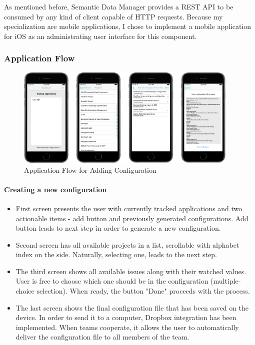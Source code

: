 As mentioned before, Semantic Data Manager provides a REST API to be consumed by any kind of client capable of HTTP requests. Because my specialization are mobile applications, I chose to implement a mobile application for iOS as an administrating user interface for this component.

\subsubsection{Application Flow}

\begin{figure}[!ht]
	\centering
	\includegraphics[width=0.95\textwidth]{figures/04_implementation/add_flow}
    \caption{Application Flow for Adding Configuration}
\end{figure}

\paragraph{Creating a new configuration}

\begin{itemize}
	\item First screen presents the user with currently tracked applications and two actionable items - add button and previously generated configurations. Add button leads to next step in order to generate a new configuration.
	\item Second screen has all available projects in a list, scrollable with alphabet index on the side. Naturally, selecting one, leads to the next step.
	\item The third screen shows all available issues along with their watched values. User is free to choose which one should be in the configuration (multiple-choice selection). When ready, the button "Done" proceeds with the process.
	\item The last screen shows the final configuration file that has been saved on the device. In order to send it to a computer, Dropbox integration has been implemented. When teams cooperate, it allows the user to automatically deliver the configuration file to all members of the team.
\end{itemize}

